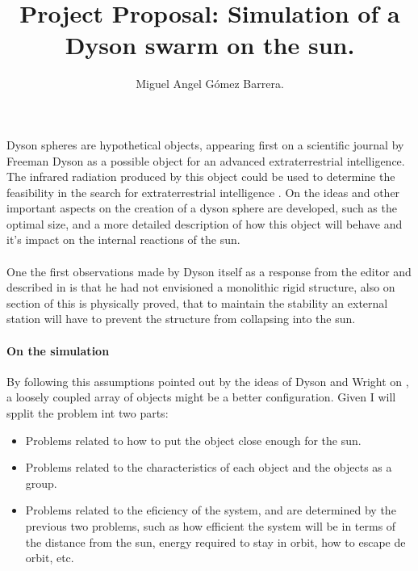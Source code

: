 \documentclass{article}
\title{Project Proposal: Simulation of a Dyson swarm on the sun.}
\author{Miguel Angel Gómez Barrera.}
\begin{document}
	\maketitle
\paragraph{}
\paragraph{} Dyson spheres are hypothetical objects, appearing first on a scientific journal by Freeman Dyson as a possible object for an advanced extraterrestrial intelligence. The infrared radiation produced by this object could be used to determine the feasibility in the search for extraterrestrial intelligence \cite{dyson_search_1960}. On \cite{wright_dyson_2020} the ideas and other important aspects on the creation of a dyson sphere are developed, such as the optimal size, and a more detailed description of how this object will behave and it's impact on the internal reactions of the sun.
\paragraph{} One the first observations made by Dyson itself as a response from the editor and described in \cite{wright_dyson_2020} is that he had not envisioned a monolithic rigid structure, also on section of \cite{wright_dyson_2020} this is physically proved, that to maintain the stability an external station will have to prevent the structure from collapsing into the sun.
\paragraph{On the simulation} By following this assumptions pointed out by the ideas of Dyson and Wright on \cite{wright_dyson_2020}, a loosely coupled array of objects might be a better configuration. Given I will spplit the problem int two parts:
\begin{itemize}
	\item Problems related to how to put the object close enough for the sun.
	\item Problems related to the characteristics of each object and the objects as a group.
	\item Problems related to the eficiency of the system, and are determined by the previous two problems, such as how efficient the system will be in terms of the distance from the sun, energy required to stay in orbit, how to escape de orbit, etc.
\end{itemize}
\end{document}
